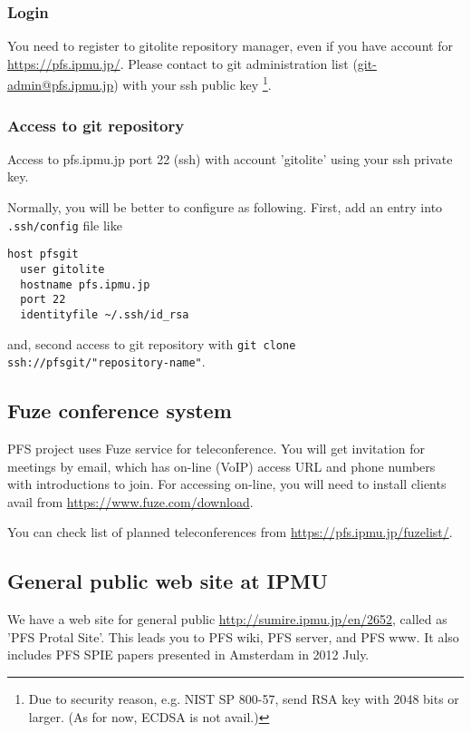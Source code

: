 \documentclass[a4paper,notitlepage]{article}
\begin{document}
\subsubsection{Login}

You need to register to gitolite repository manager, even if you have account 
for \url{https://pfs.ipmu.jp/}. Please contact to git administration list 
(\url{git-admin@pfs.ipmu.jp}) with your ssh public key
\footnote{Due to security reason, e.g. NIST SP 800-57, send RSA key with 
2048 bits or larger. (As for now, ECDSA is not avail.)}.

\subsubsection{Access to git repository}

Access to pfs.ipmu.jp port 22 (ssh) with account 'gitolite' 
using your ssh private key. 

Normally, you will be better to configure as following. 
First, add an entry into {\tt .ssh/config} file like 

\begin{verbatim}
host pfsgit
  user gitolite
  hostname pfs.ipmu.jp
  port 22
  identityfile ~/.ssh/id_rsa
\end{verbatim}

and, second access to git repository with 
{\tt git clone ssh://pfsgit/"repository-name"}.

\subsection{Fuze conference system}
\label{sec:pfs-fuze}

PFS project uses Fuze service for teleconference. 
You will get invitation for meetings by email, which has on-line (VoIP) 
access URL and phone numbers with introductions to join. 
For accessing on-line, you will need to install clients avail from 
\url{https://www.fuze.com/download}. 

You can check list of planned teleconferences from 
\url{https://pfs.ipmu.jp/fuzelist/}. 

\subsection{General public web site at IPMU}

We have a web site for general public \url{http://sumire.ipmu.jp/en/2652}, 
called as 'PFS Protal Site'.
This leads you to PFS wiki, PFS server, and PFS www.
It also includes PFS SPIE papers presented in Amsterdam in 2012 July.
\end{document}

